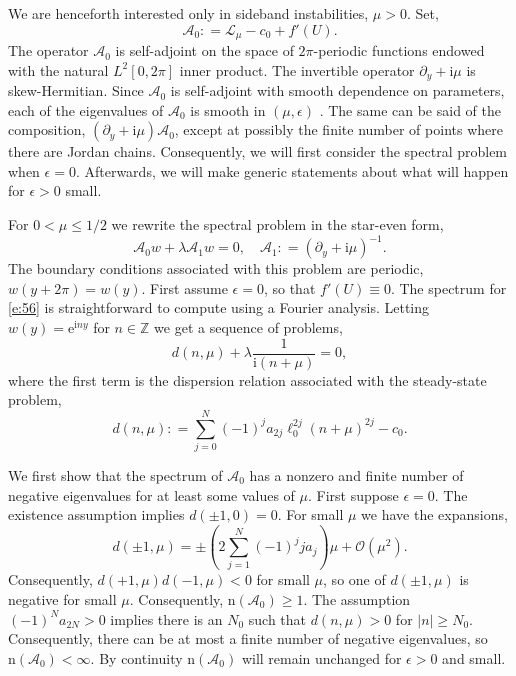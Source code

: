 \documentclass[review,onefignum,onetabnum]{siamart171218}
\newcommand{\Z}{\mathbb{Z}}
\def\coloneqq{\mathrel{\mathop:}=}
\newcommand{\rme}{\mathrm{e}}
\newcommand{\rmi}{\mathrm{i}}
\newcommand{\rmn}{\mathrm{n}}
\newcommand{\calA}{\mathcal{A}}
\newcommand{\calL}{\mathcal{L}}
\newcommand{\calO}{\mathcal{O}}
\begin{document}
We are henceforth interested only in sideband instabilities, $\mu>0$.
Set,
\[
\calA_0\coloneqq\calL_\mu-c_0+f'(U).
\]
The operator $\calA_0$ is self-adjoint on the space of $2\pi$-periodic
functions endowed with the natural $L^2[0,2\pi]$ inner product. The
invertible operator $\partial_y+\rmi\mu$ is skew-Hermitian.  Since $\calA_0$ is self-adjoint with smooth dependence on parameters, each of the eigenvalues of $\calA_0$ is smooth in $(\mu,\epsilon)$ \cite{kato:ptf80}. The same can be said of the composition, $(\partial_y+\rmi\mu)\calA_0$, except at possibly the finite number of points where there are Jordan chains. Consequently, we will first consider the spectral problem
when $\epsilon=0$. Afterwards, we will make generic statements about what
will happen for $\epsilon>0$ small.

For $0<\mu\le1/2$ we rewrite the spectral problem in the star-even form,
\begin{equation}\label{e:56}
\calA_0w+\lambda\calA_1w=0,\quad
\calA_1\coloneqq\left(\partial_y+\rmi\mu\right)^{-1}.
\end{equation}
The boundary conditions associated with this problem are periodic,
$w(y+2\pi)=w(y)$.
First assume $\epsilon=0$, so that $f'(U)\equiv0$. The spectrum for \cref{e:56} is straightforward to compute using a Fourier analysis. Letting
$w(y)=\rme^{\rmi ny}$ for $n\in\Z$ we get a sequence of problems,
\begin{equation}\label{e:57}
d(n,\mu)+\lambda\frac{1}{\rmi(n+\mu)}=0,
\end{equation}
where the first term is the dispersion relation associated with the
steady-state problem,
\[
d(n,\mu)\coloneqq\sum_{j=0}^N(-1)^ja_{2j}\ell_0^{2j}(n+\mu)^{2j}-c_0.
\]

We first show that the spectrum of $\calA_0$ has a nonzero and finite number of negative eigenvalues for at least some values of $\mu$. First suppose $\epsilon=0$.
The existence assumption implies $d(\pm1,0)=0$. For small $\mu$ we have the
expansions,
\begin{equation}\label{e:58}
d(\pm1,\mu)=\pm\left(2\sum_{j=1}^N(-1)^jja_j\right)\mu+\calO(\mu^2).
\end{equation}
Consequently, $d(+1,\mu)d(-1,\mu)<0$ for small $\mu$, so one of $d(\pm1,\mu)$ is negative for small $\mu$. Consequently, $\rmn(\calA_0)\ge1$. The assumption $(-1)^Na_{2N}>0$ implies there
is an $N_0$ such that $d(n,\mu)>0$ for $|n|\ge N_0$. Consequently, there can be at most a finite number of negative eigenvalues, so
$\rmn(\calA_0)<\infty$. By continuity $\rmn(\calA_0)$ will remain unchanged for $\epsilon>0$ and small.
\end{document}
